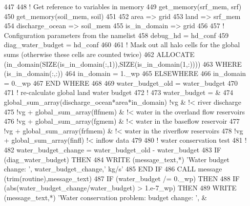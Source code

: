 \begin{DoxyCode}
447 
448     \textcolor{comment}{! Get reference to variables in memory}
449     get\_memory(srf\_mem, srf)
450     get\_memory(soil\_mem, soil)
451 
452     area            => grid         %
453     land            => srf\_mem  %
454     discharge\_ocean => soil\_mem %
455     is\_in\_domain    => grid%
456 
457     \textcolor{comment}{! Configuration parameters from the namelist}
458     debug\_hd          = hd\_conf%
459     diag\_water\_budget = hd\_conf%
460 
461     \textcolor{comment}{! Mask out all halo cells for the global sums (otherwise these cells are counted twice)}
462     \textcolor{keyword}{ALLOCATE} (in\_domain(\textcolor{keyword}{SIZE}(is\_in\_domain(:,1)),\textcolor{keyword}{SIZE}(is\_in\_domain(1,:))))
463     \textcolor{keywordflow}{WHERE} (is\_in\_domain(:,:))
464       in\_domain = 1.\_wp
465     \textcolor{keywordflow}{ELSEWHERE}
466       in\_domain = 0.\_wp
467 \textcolor{keywordflow}{    END WHERE}
468 
469     water\_budget\_old = water\_budget
470 
471     \textcolor{comment}{! re-calculate global land water budget}
472     \textcolor{comment}{!}
473     water\_budget = &
474            global\_sum\_array(discharge\_ocean*area*in\_domain)  \textcolor{comment}{!vg  & !< river discharge}
475 \textcolor{comment}{!vg          + global\_sum\_array(flfmem)                    & !< water in the overland flow reservoirs}
476 \textcolor{comment}{!vg          + global\_sum\_array(fgmem)                     & !< water in the baseflow reservoir}
477 \textcolor{comment}{!vg          + global\_sum\_array(frfmem)                    & !< water in the riverflow reservoirs}
478 \textcolor{comment}{!vg          + global\_sum\_array(finfl)                       !< inflow data}
479 
480     \textcolor{comment}{! water conservation test}
481     \textcolor{comment}{!}
482     water\_budget\_change = water\_budget\_old - water\_budget
483     \textcolor{keywordflow}{IF} (diag\_water\_budget) \textcolor{keywordflow}{THEN}
484       \textcolor{keyword}{WRITE} (message\_text,*) \textcolor{stringliteral}{'Water budget change: '}, water\_budget\_change,\textcolor{stringliteral}{' kg/s'}
485 \textcolor{keywordflow}{    END IF}
486     \textcolor{keyword}{CALL }message (trim(routine),message\_text)
487     \textcolor{keywordflow}{IF} (water\_budget /= 0.\_wp) \textcolor{keywordflow}{THEN}
488       \textcolor{keywordflow}{IF} (abs(water\_budget\_change/water\_budget) > 1.e-7\_wp) \textcolor{keywordflow}{THEN}
489         \textcolor{keyword}{WRITE} (message\_text,*) \textcolor{stringliteral}{'Water conservation problem: budget change: '}, &

\end{DoxyCode}
